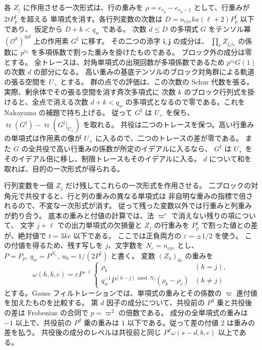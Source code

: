 各 \(Z_j\) に作用させる一次形式は、行の重みを
\(\rho=e_{r_p}-e_{r_p-1}\) として、行重みが \(2tP_p^\ell\) を超える
単項式を消す。各行列変数の次数は
\(D=n_\mathrm{cyc}ka(\ell+2)P_p^\ell\) 以下であり、
仮定から \(D+k<q_w\) である。
次数 \(d\le D\) の多項式 \(G\) をテンソル冪
\((\mathcal O^k)^{\otimes d}\) 上の作用素 \(G^\sharp\) に移す。
その二つの添字 \(\boldsymbol i,\boldsymbol j\) の成分は、
\(\prod_\nu Z_{j_\nu i_\nu}\) の係数に
\(p^{c_0}\) を多項係数で割った重みを掛けたものである。
ブロック外の成分は零とする。
全トレースは、対角単項式の出現回数が多項係数であるため
\(p^{c_0}G(1)\) の次数 \(d\) の部分になる。
高い重みの基底テンソルのブロック対角群による軌道の張る空間を \(U_+\) とする。
群の点での評価は、この次数の Schur 代数を張る。
実際、剰余体でその張る空間を消す斉次多項式に
次数 \(k\) のブロック行列式を掛けると、全点で消える次数 \(d+k<q_w\)
の多項式となるので零である。これを Nakayama の補題で持ち上げる。
従って \(G^\sharp\) は \(U_+\) を保ち、
\(\operatorname{tr}(G^\sharp)-\operatorname{tr}(G^\sharp|_{U_+})\) を取れる。
共役は二つのトレースを保つ。高い行重みの単項式は作用素の像が
\(U_+\) に入るので、二つのトレースの差が零である。
また \(G\) の全共役で高い行重みの係数が所定のイデアルに入るなら、
\(G^\sharp\) は \(U_+\) をそのイデアル倍に移し、制限トレースもそのイデアルに入る。
\(d\) について和を取れば、目的の一次形式が得られる。

行列変数を一個 \(Z_j\) だけ残してこれらの一次形式を作用させる。
二ブロックの対角元で共役すると、行と列の重みの異なる単項式は
非自明な重みの指標で倍されるので、不変な一次形式が消す。
従って残った変数以外では行重みと列重みが釣り合う。
底本の重みと付値の計算では、法 \(\varpi^c\) で消えない残りの項について、
文字 \(j+\ell\) での出力単項式の欠損量と
\(Z_j\) の行重みを \(P_p^\ell\) で割った値との差が、絶対値で \(t=3kc\) 以下である。
ここでは正負両方の \(\varepsilon=\pm1/2\) を使う。
この付値を得るため、残す写しを \(j\)、文字数を \(N_c=n_\mathrm{cyc}\) とし、
\(P=P_p,\ q_w=P^{N_c},\ u_0=1/(2P^\ell)\) と書く。
変数 \((Z_h)_{bc}\) の重みを
\[
 \omega(h,b,c)=\varepsilon P^{-\ell}
 \begin{cases}
 \rho_b & (h=j),\\
 q_w^{-1}P^{(h-j)\bmod N_c}(\rho_b-\rho_c) & (h\ne j)
 \end{cases}
\]
とする。Gauss フィルトレーションでは、単項式の重みとその係数の
\(\varpi\) 進付値を加えたものを比較する。
第 \(d\) 因子の成分について、共役前の \(P^d\) 乗と共役後の差は
Frobenius の合同で \(p=\varpi^2\) の倍数である。
成分の全単項式の重みは \(-1\) 以上で、共役前の \(P^d\) 乗の重みは
\(1\) 以下である。従って差の付値 \(2\) は重みの差を払う。
共役後の成分のレベルは共役前と同じ \(P^d\omega(s-d,b,c)\) 以上である。

